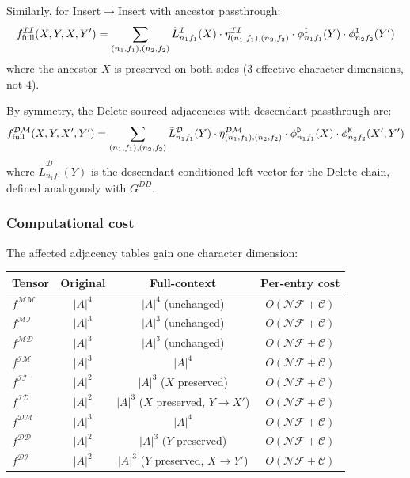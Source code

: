 \documentclass{article}
\newcommand\dom{n}
\newcommand\ndom{\mathcal{N}}
\newcommand\nfrag{\mathcal{F}}
\newcommand\alphabet{A}
\newcommand\mat{{\tt M}}
\newcommand\ins{{\tt I}}
\newcommand\del{{\tt D}}
\newcommand\frag{f}
\newcommand\nclasses{\mathcal{C}}
\begin{document}
Similarly, for Insert$\to$Insert with ancestor passthrough:
\[
f^{\mathcal{I}\mathcal{I}}_{\text{full}}(X, Y, X, Y')
= \sum_{(\dom_1,\frag_1),(\dom_2,\frag_2)}
  \tilde{L}^{\mathcal{I}}_{\dom_1\frag_1}(X)
  \cdot \eta^{\mathcal{II}}_{(\dom_1,\frag_1),(\dom_2,\frag_2)}
  \cdot \phi^{\ins}_{\dom_1\frag_1}(Y)
  \cdot \phi^{\ins}_{\dom_2\frag_2}(Y')
\]
where the ancestor $X$ is preserved on both sides (3 effective
character dimensions, not 4).

By symmetry, the Delete-sourced adjacencies with descendant passthrough are:
\begin{equation}\label{eq:full-dm}
f^{\mathcal{D}\mathcal{M}}_{\text{full}}(X, Y, X', Y')
= \sum_{(\dom_1,\frag_1),(\dom_2,\frag_2)}
  \tilde{L}^{\mathcal{D}}_{\dom_1\frag_1}(Y)
  \cdot \eta^{\mathcal{DM}}_{(\dom_1,\frag_1),(\dom_2,\frag_2)}
  \cdot \phi^{\del}_{\dom_1\frag_1}(X)
  \cdot \phi^{\mat}_{\dom_2\frag_2}(X', Y')
\end{equation}
where $\tilde{L}^{\mathcal{D}}_{\dom_1\frag_1}(Y)$ is the
descendant-conditioned left vector for the Delete chain, defined
analogously with $G^{DD}$.

\subsubsection{Computational cost}

The affected adjacency tables gain one character dimension:

\begin{center}
\begin{tabular}{lccc}
\toprule
Tensor & Original & Full-context & Per-entry cost \\
\midrule
$f^{\mathcal{M}\mathcal{M}}$ & $|\alphabet|^4$ & $|\alphabet|^4$ (unchanged) & $O(\ndom\nfrag + \nclasses)$ \\
$f^{\mathcal{M}\mathcal{I}}$ & $|\alphabet|^3$ & $|\alphabet|^3$ (unchanged) & $O(\ndom\nfrag + \nclasses)$ \\
$f^{\mathcal{M}\mathcal{D}}$ & $|\alphabet|^3$ & $|\alphabet|^3$ (unchanged) & $O(\ndom\nfrag + \nclasses)$ \\
$f^{\mathcal{I}\mathcal{M}}$ & $|\alphabet|^3$ & $|\alphabet|^4$ & $O(\ndom\nfrag + \nclasses)$ \\
$f^{\mathcal{I}\mathcal{I}}$ & $|\alphabet|^2$ & $|\alphabet|^3$ ($X$ preserved) & $O(\ndom\nfrag + \nclasses)$ \\
$f^{\mathcal{I}\mathcal{D}}$ & $|\alphabet|^2$ & $|\alphabet|^3$ ($X$ preserved, $Y \to X'$) & $O(\ndom\nfrag + \nclasses)$ \\
$f^{\mathcal{D}\mathcal{M}}$ & $|\alphabet|^3$ & $|\alphabet|^4$ & $O(\ndom\nfrag + \nclasses)$ \\
$f^{\mathcal{D}\mathcal{D}}$ & $|\alphabet|^2$ & $|\alphabet|^3$ ($Y$ preserved) & $O(\ndom\nfrag + \nclasses)$ \\
$f^{\mathcal{D}\mathcal{I}}$ & $|\alphabet|^2$ & $|\alphabet|^3$ ($Y$ preserved, $X \to Y'$) & $O(\ndom\nfrag + \nclasses)$ \\
\bottomrule
\end{tabular}
\end{center}
\end{document}
